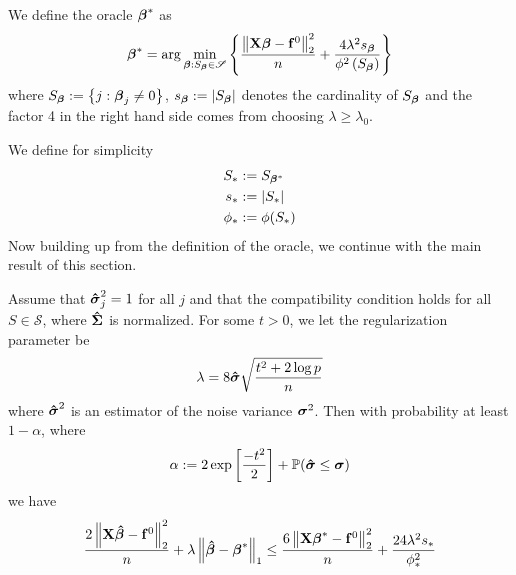 \begin{definition}
    We define the oracle $\boldsymbol{\beta}^{*}$ as
    \[
        \boldsymbol{\beta}^{*} = \arg \min_{\boldsymbol{\beta}: S_{\boldsymbol{\beta}} \in \mathscr{S}} \left\{ \frac{ \left\| \mathbf{X} \boldsymbol{\beta} - \mathbf{f}^{0} \right\|_{2}^{2}}{n} + \frac{4 \lambda^{2} s_{\boldsymbol{\beta}}}{\phi^{2}\left(S_{\boldsymbol{\beta}}\right)}\right\}
    \]
    where $S_{\boldsymbol{\beta}}:=\left\{j: \boldsymbol{\beta}_{j} \neq 0\right\}$, $s_{\boldsymbol{\beta}}:=\left|S_{\boldsymbol{\beta}}\right|$ denotes the cardinality of $S_{\boldsymbol{\beta}}$ and the factor 4 in the right hand side comes from choosing $\lambda \geq \lambda_0$.
\end{definition}
We define for simplicity
\begin{align*}
    S_* & := S_{\boldsymbol{\beta}^*} \\
    s_* & := |S_*| \\
    \phi_* & := \phi(S_*) \\
\end{align*}
Now building up from the definition of the oracle, we continue with the main result of this section.
\begin{theorem}
    Assume that \(\boldsymbol{\hat{\sigma}}_{j}^{2}=1\) for all \(j\) and that the compatibility condition holds for all \(S \in \mathscr{S}\), where \(\boldsymbol{\hat{\Sigma}}\) is normalized. For some \(t>0\), we let the regularization parameter be
    \[
        \lambda=8 \boldsymbol{\hat{\sigma}} \sqrt{\frac{t^{2} + 2 \log p}{n}}
    \]
    where \(\boldsymbol{\hat{\sigma}}^{2}\) is an estimator of the noise variance \(\boldsymbol{\sigma}^{2}\). Then with probability at least \(1-\alpha\), where
    \[
        \alpha := 2 \exp \left[ \frac{-t^{2}}{2} \right] + \mathbb{P}(\boldsymbol{\hat{\sigma}} \leq \boldsymbol{\sigma})
    \]
    we have
    \[
        \frac{2\left\|\mathbf{X} \boldsymbol{\hat{\beta}}-\mathbf{f}^{0}\right\|_{2}^{2}}{n} +  \lambda\left\|\boldsymbol{\hat{\beta}}-\boldsymbol{\beta}^{*}\right\|_{1} \leq \frac{6 \left\|\mathbf{X} \boldsymbol{\beta}^{*} - \mathbf{f}^{0}\right\|_{2}^{2}}{n} + \frac{24 \lambda^{2} s_{*}}{\phi_{*}^{2}}
    \]
\end{theorem}
